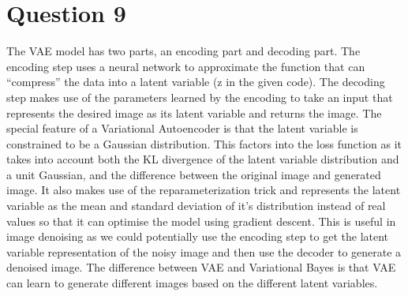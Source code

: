 \documentclass[]{article}
\begin{document}
    \section*{Question 9}
        \par The VAE model has two parts, an encoding part and decoding part. The encoding step uses a
        neural network to approximate the function that can “compress” the data into a latent variable (z
        in the given code). The decoding step makes use of the parameters learned by the encoding to take
        an input that represents the desired image as its latent variable and returns the image. The special
        feature of a Variational Autoencoder is that the latent variable is constrained to be a Gaussian
        distribution. This factors into the loss function as it takes into account both the KL divergence of the latent variable distribution and a unit Gaussian, and the difference between the original image
        and generated image. It also makes use of the reparameterization trick and represents the latent
        variable as the mean and standard deviation of it’s distribution instead of real values so that it
        can optimise the model using gradient descent. This is useful in image denoising as we could
        potentially use the encoding step to get the latent variable representation of the noisy image and
        then use the decoder to generate a denoised image. The difference between VAE and Variational
        Bayes is that VAE can learn to generate different images based on the different latent variables.
\end{document}
